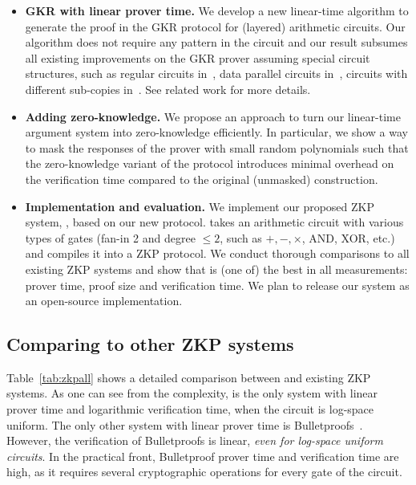\begin{itemize}[leftmargin=*]
	\item \textbf{GKR with linear prover time.} We develop a new linear-time algorithm to generate the proof in the GKR protocol for (layered) arithmetic circuits. Our algorithm does not require any pattern in the circuit and our result subsumes all existing improvements on the GKR prover assuming special circuit structures, such as regular circuits in~\cite{JT_Thesis}, data parallel circuits in~\cite{JT_Thesis,wahby2017full}, circuits with different sub-copies in~\cite{vram}. See related work for more details. 
	\item \textbf{Adding zero-knowledge.} We propose an approach to turn our linear-time argument system into zero-knowledge efficiently. In particular, we show a way to mask the responses of the prover with small random polynomials such that the zero-knowledge variant of the protocol introduces minimal overhead on the verification time compared to the original (unmasked) construction. 
	\item \textbf{Implementation and evaluation.}  We implement our proposed ZKP system, \name, based on our new protocol. \name takes an arithmetic circuit with various types of gates (fan-in 2 and degree $\le 2$, such as $+,-,\times$, AND, XOR, etc.) and compiles it into a ZKP protocol. We conduct thorough comparisons to all existing ZKP systems and show that \name is (one of) the best in all measurements: prover time, proof size and verification time. We plan to release our system as an open-source implementation.

\end{itemize}

\subsection{Comparing to other ZKP systems} Table~\ref{tab:zkpall} shows a detailed comparison between \name and existing ZKP systems. As one can see from the complexity, \name is the only system with linear prover time and logarithmic verification time, when the circuit is log-space uniform. 
The only other system with linear prover time is Bulletproofs~\cite{bulletproofs}. However, the verification of Bulletproofs is linear, \emph{even for log-space uniform circuits}. In the practical front, Bulletproof prover time and verification time are high, as it requires several cryptographic operations for every gate of the circuit.

